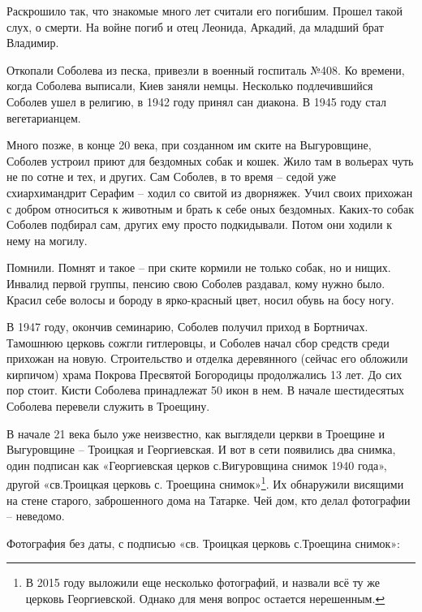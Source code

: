Раскрошило так, что знакомые много лет считали его погибшим. Прошел такой слух, о смерти. На войне погиб и отец Леонида, Аркадий, да младший брат Владимир.

Откопали Соболева из песка, привезли в военный госпиталь №408. Ко времени, когда Соболева выписали, Киев заняли немцы. Несколько подлечившийся Соболев ушел в религию, в 1942 году принял сан диакона. В 1945 году стал вегетарианцем. 

Много позже, в конце 20 века, при созданном им ските на Выгуровщине, Соболев устроил приют для бездомных собак и кошек. Жило там в вольерах чуть не по сотне и тех, и других. Сам Соболев, в то время – седой уже схиархимандрит Серафим – ходил со свитой из дворняжек. Учил своих прихожан с добром относиться к животным и брать к себе оных бездомных. Каких-то собак Соболев подбирал сам, других ему просто подкидывали. Потом они ходили к нему на могилу.

Помнили. Помнят и такое – при ските кормили не только собак, но и нищих. Инвалид первой группы, пенсию свою Соболев раздавал, кому нужно было. Красил себе волосы и бороду в ярко-красный цвет, носил обувь на босу ногу.

В 1947 году, окончив семинарию, Соболев получил приход в Бортничах. Тамошнюю церковь сожгли гитлеровцы, и Соболев начал сбор средств среди прихожан на новую. Строительство и отделка деревянного (сейчас его обложили кирпичом) храма Покрова Пресвятой Богородицы продолжались 13 лет. До сих пор стоит. Кисти Соболева принадлежат 50 икон в нем. В начале шестидесятых Соболева перевели служить в Троещину.


В начале 21 века было уже неизвестно, как выглядели церкви в Троещине и Выгуровщине – Троицкая и Георгиевская. И вот в сети появились два снимка, один подписан как «Георгиевская церков с.Вигуровщина снимок 1940 года», другой «св.Троицкая церковь с. Троещина снимок»\footnote{В 2015 году выложили еще несколько фотографий, и назвали всё ту же церковь Георгиевской. Однако для меня вопрос остается нерешенным.}. Их обнаружили висящими на стене старого, заброшенного дома на Татарке. Чей дом, кто делал фотографии – неведомо.


Фотография без даты, с подписью «св. Троицкая церковь с.Троещина снимок»:

